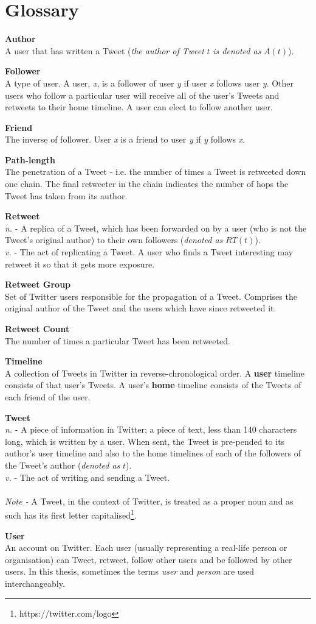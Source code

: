 \chapter*{Glossary} 

{\bf Author}\\
A user that has written a Tweet  (\textit{the author of Tweet} $t$ \textit{is denoted as} $A(t)$). 

{\bf Follower}\\
A type of user. A user, \textit{x}, is a follower of user \textit{y} if user \textit{x} follows user \textit{y}. Other users who follow a particular user will receive all of the user's Tweets and retweets to their home timeline. A user can elect to follow another user.

{\bf Friend}\\
The inverse of follower. User \textit{x} is a friend to user \textit{y} if \textit{y} follows \textit{x}.

{\bf Path-length}\\
The penetration of a Tweet - i.e. the number of times a Tweet is retweeted down one chain. The final retweeter in the chain indicates the number of hops the Tweet has taken from its author.
			
{\bf Retweet}\\
\textit{n.} - A replica of a Tweet, which has been forwarded on by a user (who is not the Tweet's original author) to their own followers (\textit{denoted as} $RT(t)$). \\
\textit{v.} - The act of replicating a Tweet. A user who finds a Tweet interesting may retweet it so that it gets more exposure.
									
{\bf Retweet Group}\\
Set of Twitter users responsible for the propagation of a Tweet. Comprises the original author of the Tweet and the users which have since retweeted it.

{\bf Retweet Count}\\
The number of times a particular Tweet has been retweeted.

{\bf Timeline}\\
A collection of Tweets in Twitter in reverse-chronological order. A \textbf{user} timeline consists of that user's Tweets. A user's \textbf{home} timeline consists of the Tweets of each friend of the user.

{\bf Tweet}\\
\textit{n.} - A piece of information in Twitter; a piece of text, less than 140 characters long, which is written by a user. When sent, the Tweet is pre-pended to its author's user timeline and also to the home timelines of each of the followers of the Tweet's author (\textit{denoted as} $t$).\\
\textit{v.} - The act of writing and sending a Tweet.\\ \\
\textit{Note -} A Tweet, in the context of Twitter, is treated as a proper noun and as such has its first letter capitalised\footnote{https://twitter.com/logo}.

{\bf User}\\
An account on Twitter. Each user (usually representing a real-life person or organisation) can Tweet, retweet, follow other users and be followed by other users. In this thesis, sometimes the terms \textit{user} and \textit{person} are used interchangeably.
